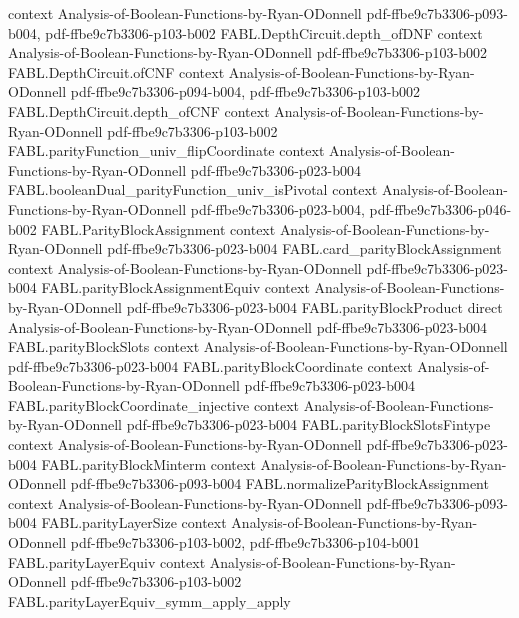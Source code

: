 \begin{theorem}
  {context}
  {Analysis-of-Boolean-Functions-by-Ryan-ODonnell}
  {pdf-ffbe9c7b3306-p093-b004,
    pdf-ffbe9c7b3306-p103-b002}
\proofstep
  {FABL.DepthCircuit.depth_ofDNF}
  {context}
  {Analysis-of-Boolean-Functions-by-Ryan-ODonnell}
  {pdf-ffbe9c7b3306-p103-b002}
\proofstep
  {FABL.DepthCircuit.ofCNF}
  {context}
  {Analysis-of-Boolean-Functions-by-Ryan-ODonnell}
  {pdf-ffbe9c7b3306-p094-b004,
    pdf-ffbe9c7b3306-p103-b002}
\proofstep
  {FABL.DepthCircuit.depth_ofCNF}
  {context}
  {Analysis-of-Boolean-Functions-by-Ryan-ODonnell}
  {pdf-ffbe9c7b3306-p103-b002}
\proofstep
  {FABL.parityFunction_univ_flipCoordinate}
  {context}
  {Analysis-of-Boolean-Functions-by-Ryan-ODonnell}
  {pdf-ffbe9c7b3306-p023-b004}
\proofstep
  {FABL.booleanDual_parityFunction_univ_isPivotal}
  {context}
  {Analysis-of-Boolean-Functions-by-Ryan-ODonnell}
  {pdf-ffbe9c7b3306-p023-b004,
    pdf-ffbe9c7b3306-p046-b002}
\proofstep
  {FABL.ParityBlockAssignment}
  {context}
  {Analysis-of-Boolean-Functions-by-Ryan-ODonnell}
  {pdf-ffbe9c7b3306-p023-b004}
\proofstep
  {FABL.card_parityBlockAssignment}
  {context}
  {Analysis-of-Boolean-Functions-by-Ryan-ODonnell}
  {pdf-ffbe9c7b3306-p023-b004}
\proofstep
  {FABL.parityBlockAssignmentEquiv}
  {context}
  {Analysis-of-Boolean-Functions-by-Ryan-ODonnell}
  {pdf-ffbe9c7b3306-p023-b004}
\proofstep
  {FABL.parityBlockProduct}
  {direct}
  {Analysis-of-Boolean-Functions-by-Ryan-ODonnell}
  {pdf-ffbe9c7b3306-p023-b004}
\proofstep
  {FABL.parityBlockSlots}
  {context}
  {Analysis-of-Boolean-Functions-by-Ryan-ODonnell}
  {pdf-ffbe9c7b3306-p023-b004}
\proofstep
  {FABL.parityBlockCoordinate}
  {context}
  {Analysis-of-Boolean-Functions-by-Ryan-ODonnell}
  {pdf-ffbe9c7b3306-p023-b004}
\proofstep
  {FABL.parityBlockCoordinate_injective}
  {context}
  {Analysis-of-Boolean-Functions-by-Ryan-ODonnell}
  {pdf-ffbe9c7b3306-p023-b004}
\proofstep
  {FABL.parityBlockSlotsFintype}
  {context}
  {Analysis-of-Boolean-Functions-by-Ryan-ODonnell}
  {pdf-ffbe9c7b3306-p023-b004}
\proofstep
  {FABL.parityBlockMinterm}
  {context}
  {Analysis-of-Boolean-Functions-by-Ryan-ODonnell}
  {pdf-ffbe9c7b3306-p093-b004}
\proofstep
  {FABL.normalizeParityBlockAssignment}
  {context}
  {Analysis-of-Boolean-Functions-by-Ryan-ODonnell}
  {pdf-ffbe9c7b3306-p093-b004}
\proofstep
  {FABL.parityLayerSize}
  {context}
  {Analysis-of-Boolean-Functions-by-Ryan-ODonnell}
  {pdf-ffbe9c7b3306-p103-b002,
    pdf-ffbe9c7b3306-p104-b001}
\proofstep
  {FABL.parityLayerEquiv}
  {context}
  {Analysis-of-Boolean-Functions-by-Ryan-ODonnell}
  {pdf-ffbe9c7b3306-p103-b002}
\proofstep
  {FABL.parityLayerEquiv_symm_apply_apply}

\end{theorem}
